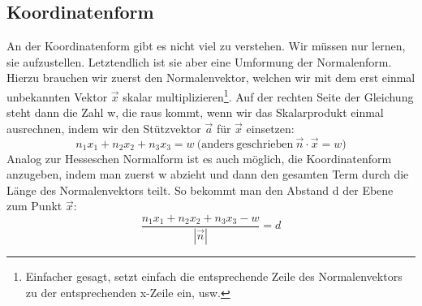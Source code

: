 	\subsection{Koordinatenform}
		An der Koordinatenform gibt es nicht viel zu verstehen. Wir müssen nur lernen,
		sie aufzustellen. Letztendlich ist sie aber eine Umformung der Normalenform.
		Hierzu brauchen wir zuerst den Normalenvektor, welchen wir mit dem erst einmal
		unbekannten Vektor \(\vec{x}\) skalar multiplizieren\footnote{Einfacher
		gesagt, setzt einfach die entsprechende Zeile des Normalenvektors zu der
		entsprechenden x-Zeile ein, usw.}. Auf der rechten Seite der Gleichung steht
		dann die Zahl w, die raus kommt, wenn wir das Skalarprodukt einmal ausrechnen,
		indem wir den Stützvektor \(\vec{a}\) für \(\vec{x}\) einsetzen:
		\[n_1x_1+n_2x_2+n_3x_3=w \mathrm{\ (anders\ geschrieben\ } \vec{n}\cdot
		\vec{x}=w)\]
		Analog zur Hesseschen Normalform ist es auch möglich, die
		Koordinatenform anzugeben, indem man zuerst w abzieht und dann den gesamten
		Term durch die Länge des Normalenvektors teilt. So bekommt man den Abstand d
		der Ebene zum Punkt \(\vec{x}\):
		\[\frac{n_1x_1+n_2x_2+n_3x_3-w}{|\vec{n}|}=d\]

